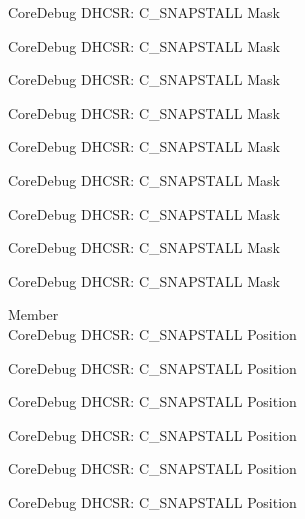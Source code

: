 \begin{DoxyRefList}
\label{deprecated__deprecated000394}%
%
Core\+Debug DHCSR\+: C\+\_\+\+SNAPSTALL Mask 

\label{deprecated__deprecated000483}%
%
Core\+Debug DHCSR\+: C\+\_\+\+SNAPSTALL Mask 

\label{deprecated__deprecated000585}%
%
Core\+Debug DHCSR\+: C\+\_\+\+SNAPSTALL Mask 

\label{deprecated__deprecated000691}%
%
Core\+Debug DHCSR\+: C\+\_\+\+SNAPSTALL Mask 

\label{deprecated__deprecated000835}%
%
Core\+Debug DHCSR\+: C\+\_\+\+SNAPSTALL Mask 

\label{deprecated__deprecated000977}%
%
Core\+Debug DHCSR\+: C\+\_\+\+SNAPSTALL Mask 

\label{deprecated__deprecated001053}%
%
Core\+Debug DHCSR\+: C\+\_\+\+SNAPSTALL Mask 

\label{deprecated__deprecated001142}%
%
Core\+Debug DHCSR\+: C\+\_\+\+SNAPSTALL Mask 

\label{deprecated__deprecated001244}%
%
Core\+Debug DHCSR\+: C\+\_\+\+SNAPSTALL Mask  
\item[Member \doxylink{group___c_m_s_i_s___core_debug_ga85747214e2656df6b05ec72e4d22bd6d}{Core\+Debug\+\_\+\+DHCSR\+\_\+\+C\+\_\+\+SNAPSTALL\+\_\+\+Pos} ]\hfill \\
\label{deprecated__deprecated000031}%
%
Core\+Debug DHCSR\+: C\+\_\+\+SNAPSTALL Position 

\label{deprecated__deprecated000175}%
%
Core\+Debug DHCSR\+: C\+\_\+\+SNAPSTALL Position 

\label{deprecated__deprecated000317}%
%
Core\+Debug DHCSR\+: C\+\_\+\+SNAPSTALL Position 

\label{deprecated__deprecated000393}%
%
Core\+Debug DHCSR\+: C\+\_\+\+SNAPSTALL Position 

\label{deprecated__deprecated000482}%
%
Core\+Debug DHCSR\+: C\+\_\+\+SNAPSTALL Position 

\label{deprecated__deprecated000584}%
%
Core\+Debug DHCSR\+: C\+\_\+\+SNAPSTALL Position 


\end{DoxyRefList}

